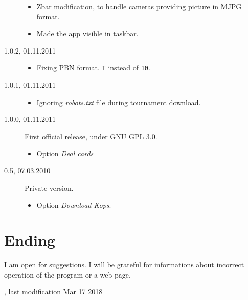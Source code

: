 \documentclass[polish,a4paper,11pt,oneside]{article}
\begin{document}
\begin{description}
\begin{itemize}
  \item Zbar modification, to handle cameras providing picture in
        MJPG format.
  \item Made the app visible in taskbar.
  \end{itemize}
\item[1.0.2, 01.11.2011]
  \begin{itemize}
  \item Fixing PBN format. \verb!T! instead of \verb!10!.
  \end{itemize}
\item[1.0.1, 01.11.2011]
  \begin{itemize}
  \item Ignoring {\em robots.txt} file during tournament download.
  \end{itemize}
\item[1.0.0, 01.11.2011]
  First official release, under GNU GPL 3.0.
  \begin{itemize}
  \item Option {\em Deal cards}
  \end{itemize}
\item[0.5, 07.03.2010]
  Private version.
  \begin{itemize}
  \item Option {\em Download Kops}.
  \end{itemize}
\end{description}

\section{Ending}

I am open for suggestions. I will be grateful for informations about incorrect operation of the program or a web-page.

{\setlength{\parindent}{0pt}\small{}
, last modification Mar 17 2018}
\end{document}
